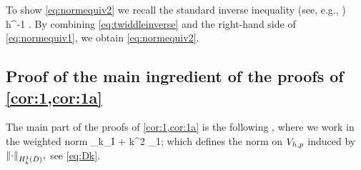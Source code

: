 To show \cref{eq:normequiv2} we recall the standard inverse inequality (see, e.g., \cite[Theorem 4.5.11 and Remark 4.5.20]{BrSc:08})
\beq\label{eq:twiddleinverse}
\NHoD{\vh} \lesssim h^{-1} \NLtD{\vh}.
\eeq
By combining \cref{eq:twiddleinverse} and the right-hand side of \cref{eq:normequiv1}, we obtain \cref{eq:normequiv2}.
\epf







\subsection{Proof of the main ingredient of the proofs of \cref{cor:1,cor:1a}}\label{sec:proofs}

The main part of the proofs of \cref{cor:1,cor:1a} is the following , where we work in the weighted norm
\beq\label{eq:Dk2}
\Dmat_k\de \Smat_I + k^2 \Mmat_1;
\eeq
which defines the norm on $V_{h,p}$ induced by $\NHokD{\cdot},$ see \cref{eq:Dk}.


